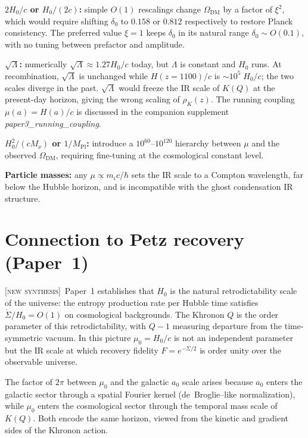 \documentclass[prd,twocolumn,superscriptaddress,longbibliography,floatfix]{revtex4-2}
\newcommand{\Hzero}{H_{0}}
\newcommand{\muzero}{\mu_{0}}
\newcommand{\OmegaDM}{\Omega_{\mathrm{DM}}}
\newcommand{\MPl}{M_{\mathrm{Pl}}}
\newcommand{\new}{\textsc{[new synthesis]}}
\begin{document}
\textbf{$2\Hzero/c$ or $\Hzero/(2c)$:} simple
$O(1)$ rescalings change $\OmegaDM$ by a factor of
$\xi^{2}$, which would require shifting
$\delta_{0}$ to $0.158$ or $0.812$ respectively to
restore Planck consistency.  The preferred value
$\xi = 1$ keeps $\delta_{0}$ in its natural range
$\delta_{0} \sim O(0.1)$, with no tuning between
prefactor and amplitude.

\textbf{$\sqrt{\Lambda}$:} numerically
$\sqrt{\Lambda} \approx 1.27 \Hzero/c$ today, but
$\Lambda$ is constant and $\Hzero$ runs.  At
recombination, $\sqrt{\Lambda}$ is unchanged while
$H(z=1100)/c$ is $\sim 10^{5}\;\Hzero/c$; the two
scales diverge in the past.  $\sqrt{\Lambda}$ would
freeze the IR scale of $K(Q)$ at the present-day
horizon, giving the wrong scaling of $\rho_{K}(z)$.
The running coupling $\mu(a) = H(a)/c$ is
discussed in the companion supplement
\emph{paper3\_running\_coupling}.

\textbf{$\Hzero^{2}/(cM_{\nu})$ or
$1/\MPl$:} introduce a $10^{60}$--$10^{120}$ hierarchy
between $\mu$ and the observed $\OmegaDM$, requiring
fine-tuning at the cosmological constant level.

\textbf{Particle masses:} any $\mu \propto m_{i}c/\hbar$
sets the IR scale to a Compton wavelength, far below
the Hubble horizon, and is incompatible with the ghost
condensation IR structure.

\section{Connection to Petz recovery (Paper~1)}
\label{sec:petz}

\new\ Paper~1 establishes that $\Hzero$ is the natural
retrodictability scale of the universe: the entropy
production rate per Hubble time satisfies
$\dot{\Sigma}/\Hzero = O(1)$ on cosmological backgrounds.
The Khronon $Q$ is the order parameter of this
retrodictability, with $Q - 1$ measuring departure from
the time-symmetric vacuum.  In this picture
$\muzero = \Hzero/c$ is not an independent parameter
but the IR scale at which recovery fidelity
$F = e^{-\Sigma/2}$ is order unity over the observable
universe.

The factor of $2\pi$ between $\muzero$ and the galactic
$a_{0}$ scale arises because $a_{0}$ enters the
galactic sector through a spatial Fourier kernel
(de~Broglie--like normalization), while $\muzero$
enters the cosmological sector through the temporal
mass scale of $K(Q)$.  Both encode the same horizon,
viewed from the kinetic and gradient sides of the
Khronon action.
\end{document}
